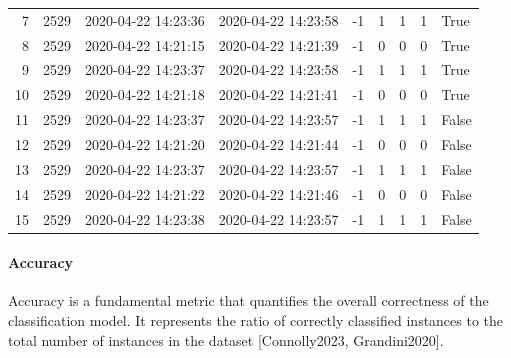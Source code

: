 \begin{table}[htbp]
{\begin{tabular}{r r l l r r r r l}
      7                               & 2529               & 2020-04-22 14:23:36  & 2020-04-22 14:23:58 & -1                & 1                      & 1                    & 1                     & True               \\
      8                               & 2529               & 2020-04-22 14:21:15  & 2020-04-22 14:21:39 & -1                & 0                      & 0                    & 0                     & True               \\
      9                               & 2529               & 2020-04-22 14:23:37  & 2020-04-22 14:23:58 & -1                & 1                      & 1                    & 1                     & True               \\
      10                              & 2529               & 2020-04-22 14:21:18  & 2020-04-22 14:21:41 & -1                & 0                      & 0                    & 0                     & True               \\
      11                              & 2529               & 2020-04-22 14:23:37  & 2020-04-22 14:23:57 & -1                & 1                      & 1                    & 1                     & False              \\
      12                              & 2529               & 2020-04-22 14:21:20  & 2020-04-22 14:21:44 & -1                & 0                      & 0                    & 0                     & False              \\
      13                              & 2529               & 2020-04-22 14:23:37  & 2020-04-22 14:23:57 & -1                & 1                      & 1                    & 1                     & False              \\
      14                              & 2529               & 2020-04-22 14:21:22  & 2020-04-22 14:21:46 & -1                & 0                      & 0                    & 0                     & False              \\
      15                              & 2529               & 2020-04-22 14:23:38  & 2020-04-22 14:23:57 & -1                & 1                      & 1                    & 1                     & False              \\
      \bottomrule
    \end{tabular}%
  }
\end{table}

\paragraph{\textbf{Accuracy}}
Accuracy is a fundamental metric that quantifies the overall correctness of the classification model. It represents the ratio of correctly classified instances to the total number of instances in the dataset [Connolly2023, Grandini2020].


